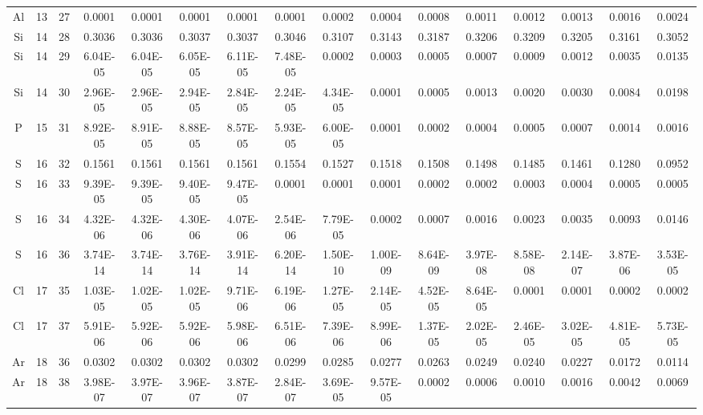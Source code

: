{\begin{tabular}{|c|c|c|c|c|c|c|c|c|c|c|c|c|c|c|c|}
Al & 13 & 27   & 0.0001    & 0.0001    & 0.0001    & 0.0001    & 0.0001    & 0.0002    & 0.0004    & 0.0008    & 0.0011    & 0.0012    & 0.0013    & 0.0016    & 0.0024    \\
Si & 14 & 28   & 0.3036    & 0.3036    & 0.3037    & 0.3037    & 0.3046    & 0.3107    & 0.3143    & 0.3187    & 0.3206    & 0.3209    & 0.3205    & 0.3161    & 0.3052    \\
Si & 14 & 29   & 6.04E-05  & 6.04E-05  & 6.05E-05  & 6.11E-05  & 7.48E-05  & 0.0002    & 0.0003    & 0.0005    & 0.0007    & 0.0009    & 0.0012    & 0.0035    & 0.0135    \\
Si & 14 & 30   & 2.96E-05  & 2.96E-05  & 2.94E-05  & 2.84E-05  & 2.24E-05  & 4.34E-05  & 0.0001    & 0.0005    & 0.0013    & 0.0020    & 0.0030    & 0.0084    & 0.0198    \\
P  & 15 & 31   & 8.92E-05  & 8.91E-05  & 8.88E-05  & 8.57E-05  & 5.93E-05  & 6.00E-05  & 0.0001    & 0.0002    & 0.0004    & 0.0005    & 0.0007    & 0.0014    & 0.0016    \\
S  & 16 & 32   & 0.1561    & 0.1561    & 0.1561    & 0.1561    & 0.1554    & 0.1527    & 0.1518    & 0.1508    & 0.1498    & 0.1485    & 0.1461    & 0.1280    & 0.0952    \\
S  & 16 & 33   & 9.39E-05  & 9.39E-05  & 9.40E-05  & 9.47E-05  & 0.0001    & 0.0001    & 0.0001    & 0.0002    & 0.0002    & 0.0003    & 0.0004    & 0.0005    & 0.0005    \\
S  & 16 & 34   & 4.32E-06  & 4.32E-06  & 4.30E-06  & 4.07E-06  & 2.54E-06  & 7.79E-05  & 0.0002    & 0.0007    & 0.0016    & 0.0023    & 0.0035    & 0.0093    & 0.0146    \\
S  & 16 & 36   & 3.74E-14  & 3.74E-14  & 3.76E-14  & 3.91E-14  & 6.20E-14  & 1.50E-10  & 1.00E-09  & 8.64E-09  & 3.97E-08  & 8.58E-08  & 2.14E-07  & 3.87E-06  & 3.53E-05  \\
Cl & 17 & 35   & 1.03E-05  & 1.02E-05  & 1.02E-05  & 9.71E-06  & 6.19E-06  & 1.27E-05  & 2.14E-05  & 4.52E-05  & 8.64E-05  & 0.0001    & 0.0001    & 0.0002    & 0.0002    \\
Cl & 17 & 37   & 5.91E-06  & 5.92E-06  & 5.92E-06  & 5.98E-06  & 6.51E-06  & 7.39E-06  & 8.99E-06  & 1.37E-05  & 2.02E-05  & 2.46E-05  & 3.02E-05  & 4.81E-05  & 5.73E-05  \\
Ar & 18 & 36   & 0.0302    & 0.0302    & 0.0302    & 0.0302    & 0.0299    & 0.0285    & 0.0277    & 0.0263    & 0.0249    & 0.0240    & 0.0227    & 0.0172    & 0.0114    \\
Ar & 18 & 38   & 3.98E-07  & 3.97E-07  & 3.96E-07  & 3.87E-07  & 2.84E-07  & 3.69E-05  & 9.57E-05  & 0.0002    & 0.0006    & 0.0010    & 0.0016    & 0.0042    & 0.0069    \\

\end{tabular}}
